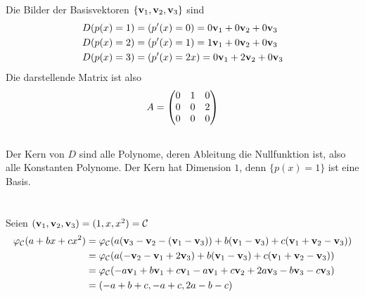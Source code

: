 \documentclass{../mfa}
\begin{document}
\subsection{}

\section{}
\subsection{}
Die Bilder der Basisvektoren $\{\mathbf{v}_{1}, \mathbf{v}_{2}, \mathbf{v}_{3}\}$ sind
\begin{align*}
   D(p(x)=1) &= (p^\prime(x) = 0) = 0\mathbf{v}_{1} + 0\mathbf{v}_{2} + 0\mathbf{v}_{3}\\
   D(p(x)=2) &= (p^\prime(x) = 1) = 1\mathbf{v}_{1} + 0\mathbf{v}_{2} + 0\mathbf{v}_{3}\\
   D(p(x)=3) &= (p^\prime(x) = 2x) = 0\mathbf{v}_{1} + 2\mathbf{v}_{2} + 0\mathbf{v}_{3}\\
\end{align*}
Die darstellende Matrix ist also
\begin{equation*}
   A = \begin{pmatrix}0 & 1 & 0 \\ 0 & 0 & 2 \\ 0 & 0 & 0\end{pmatrix}
\end{equation*}

\subsection{}
Der Kern von $D$ sind alle Polynome, deren Ableitung die Nullfunktion ist, also
alle Konstanten Polynome. Der Kern hat Dimension $1$, denn $\{p(x)=1\}$ ist eine
Basis.

\section{}

Seien $(\mathbf{v}_{1}, \mathbf{v}_{2}, \mathbf{v}_{3}) = (1,x,x^2) = \mathcal{C}$
\begin{align*}
   \varphi_\mathcal{C}(a + bx +cx^2) & = \varphi_\mathcal{C}(a(\mathbf{v}_{3} - \mathbf{v}_{2} - (\mathbf{v}_{1} - \mathbf{v}_{3})) + b(\mathbf{v}_{1} - \mathbf{v}_{3}) + c(\mathbf{v}_{1} + \mathbf{v}_{2} - \mathbf{v}_{3})) \\
                                     & = \varphi_\mathcal{C}(a(-\mathbf{v}_{2} - \mathbf{v}_{1} +
   2\mathbf{v}_{3}) + b(\mathbf{v}_{1} - \mathbf{v}_{3}) + c(\mathbf{v}_{1} + \mathbf{v}_{2} - \mathbf{v}_{3})) \\
                                     & = \varphi_\mathcal{C}(-a\mathbf{v}_{1} + b\mathbf{v}_{1} +
   c\mathbf{v}_{1} -a\mathbf{v}_{1} + c\mathbf{v}_{2} + 2a\mathbf{v}_{3} - b\mathbf{v}_{3} - c\mathbf{v}_{3}) \\
                                     & = \left(-a +b +c, -a + c, 2a -b - c\right)
\end{align*}
\end{document}
